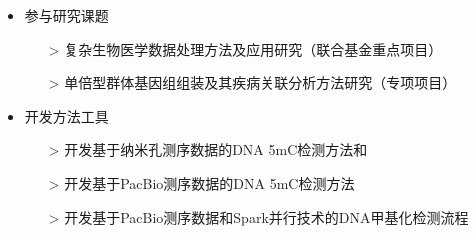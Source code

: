 \documentclass[zh]{resume}
\begin{document}
\begin{itemize}
  \item 参与研究课题
  \begin{itemize}
    \item[>] 复杂生物医学数据处理方法及应用研究（联合基金重点项目）
    \item[>] 单倍型群体基因组组装及其疾病关联分析方法研究（专项项目）
  \end{itemize}
  \item 开发方法工具
  \begin{itemize}
    \item[>] 开发基于纳米孔测序数据的DNA 5mC检测方法和
    \item[>] 开发基于PacBio测序数据的DNA 5mC检测方法
    \item[>] 开发基于PacBio测序数据和Spark并行技术的DNA甲基化检测流程
  \end{itemize}
\end{itemize}
\end{document}
